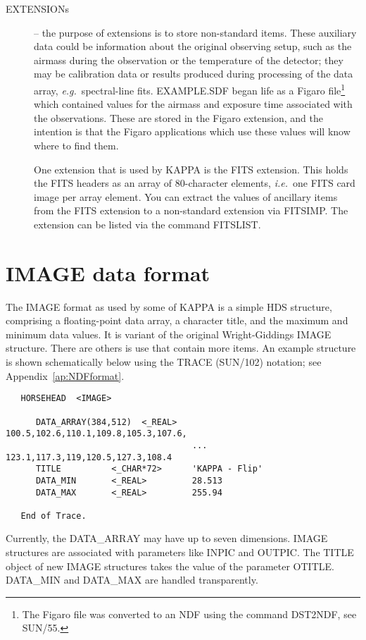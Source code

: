 {\begin{description}
\item[{EXTENSIONs}] -- the purpose of extensions is to store
non-standard items. These auxiliary data could be information about
the original observing setup, such as the airmass during the observation
or the temperature of the detector; they may be calibration data or
results produced during processing of the data array, {\it e.g.}\
spectral-line fits. EXAMPLE.SDF began life as a Figaro file\footnote{The
Figaro file was converted to an NDF using the command DST2NDF, see
SUN/55.} which contained values for the airmass and exposure time
associated with the observations. These are stored in the Figaro
extension, and the intention is that the Figaro applications which use
these values will know where to find them.

One extension that is used by {\small KAPPA} is the FITS extension.
This holds the FITS headers as an array of 80-character elements,
{\it i.e.}\ one FITS card image per array element.  You can extract
the values of ancillary items from the FITS extension to a
non-standard extension via FITSIMP.  The extension can be listed
via the command FITSLIST.
\end{description}

\newpage
\section{IMAGE data format}
\label{ap:IMAGEformat}
The IMAGE format as used by some of {\small KAPPA} is a simple
HDS structure, comprising a floating-point data array, a character title,
and the maximum and minimum data values.  It is variant of
the original Wright-Giddings IMAGE structure.  There are others is use
that contain more items.
An example structure is shown schematically below using the
TRACE (SUN/102) notation; see Appendix~\ref{ap:NDFformat}.
\begin{verbatim}
   HORSEHEAD  <IMAGE>

      DATA_ARRAY(384,512)  <_REAL>   100.5,102.6,110.1,109.8,105.3,107.6,
                                     ... 123.1,117.3,119,120.5,127.3,108.4
      TITLE          <_CHAR*72>      'KAPPA - Flip'
      DATA_MIN       <_REAL>         28.513
      DATA_MAX       <_REAL>         255.94

   End of Trace.
\end{verbatim}

Currently, the DATA\_ARRAY may have up to seven dimensions.
IMAGE structures are associated with parameters like INPIC and OUTPIC.
The TITLE object of new IMAGE structures takes the value of the
parameter OTITLE.  DATA\_MIN and DATA\_MAX are handled transparently. 

}
